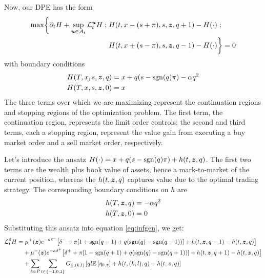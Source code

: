 Now, our DPE has the form
\begin{equation}
\label{eq:DPEmaxprofit}
\begin{split}
\max \biggl\lbrace \partial_t H + \sup \limits_{\bm{u} \in \mathcal{A}_t} \mathcal{L}^{\bm{u}}_t H \; ; \; & H(t,x-(s+\pi), s, \bm{z}, q+1) - H(\cdot) \; ; \\
&  H(t,x+(s-\pi), s, \bm{z}, q-1) - H(\cdot) \biggr\rbrace = 0
\end{split}
\end{equation}
with boundary conditions
\begin{align}
H(T, x, s, \bm{z}, q) & = x + q(s - \mathrm{sgn}(q)\pi) - \alpha q^2 \\
H(T, x, s, \bm{z}, 0) & = x
\end{align}
The three terms over which we are maximizing represent the continuation regions and stopping regions of the optimization problem. The first term, the continuation region, represents the limit order controls; the second and third terms, each a stopping region, represent the value gain from executing a buy market order and a sell market order, respectively.

Let's introduce the ansatz $H(\cdot) = x + q(s - \mathrm{sgn}(q)\pi) + h(t,\bm{z},q)$. The first two terms are the wealth plus book value of assets, hence a mark-to-market of the current position, whereas the $h(t,\bm{z},q)$ captures value due to the optimal trading strategy. The corresponding boundary conditions on $h$ are
\begin{align}
h(T, \bm{z}, q) & = - \alpha q^2 \\
h(T, \bm{z}, 0) & = 0
\end{align}
Substituting this ansatz into equation \ref{eq:infgen}, we get:
\begin{align*}
\mathcal{L}^{\delta}_t H & = \mu^+(\bm{z}) e^{ -\kappa \delta^{-}} \bigl[ \delta^- + \pi [ 1 + \mathrm{sgn}(q-1) + q(\mathrm{sgn}(q) - \mathrm{sgn}(q-1) ) ] + h(t,\bm{z},q-1) - h(t,\bm{z},q) \bigr] \\
& \quad + \mu^-(\bm{z}) e^{ -\kappa \delta^{+}} \bigl[ \delta^+ + \pi [ 1 - \mathrm{sgn}(q+1) + q(\mathrm{sgn}(q) - \mathrm{sgn}(q+1) ) ] + h(t,\bm{z},q+1) - h(t,\bm{z},q) \bigr] \\
& \quad + \sum_{k\in P} \sum_{l \in \{-1,0,1\}} G_{\bm{z},(k,l)} \left[ ql \mathbb{E} \left[ \eta_{0,\bm{z}} \right] + h(t,(k,l),q) - h(t,\bm{z},q) \right] 
\end{align*}

